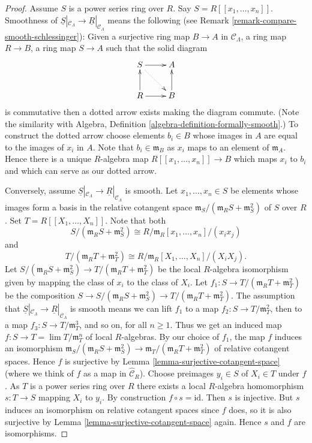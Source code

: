 \documentclass[10pt,a4paper]{amsart}
\theoremstyle{plain}
\theoremstyle{definition}
\theoremstyle{remark}
\numberwithin{equation}{subsection}
\def\lim{\mathop{\mathrm{lim}}\nolimits}
\begin{document}
\begin{proof}
Assume $S$ is a power series ring over $R$. Say $S = R[[x_1, \ldots, x_n]]$.
Smoothness of
$\underline{S}|_{\mathcal{C}_\Lambda} \to \underline{R}|_{\mathcal{C}_\Lambda}$
means the following (see Remark \ref{remark-compare-smooth-schlessinger}):
Given a surjective ring map $B \to A$ in
$\mathcal{C}_\Lambda$, a ring map $R \to B$, a ring map $S \to A$ such that
the solid diagram
$$
\xymatrix{
S \ar[r] \ar@{..>}[rd] & A \\
R \ar[u] \ar[r] & B \ar[u]
}
$$
is commutative then a dotted arrow exists making the diagram commute.
(Note the similarity with
Algebra, Definition \ref{algebra-definition-formally-smooth}.)
To construct the dotted arrow choose elements $b_i \in B$ whose images
in $A$ are equal to the images of $x_i$ in $A$. Note that
$b_i \in \mathfrak m_B$ as $x_i$ maps to an element of $\mathfrak m_A$.
Hence there is a unique $R$-algebra map $R[[x_1, \ldots, x_n]] \to B$
which maps $x_i$ to $b_i$ and which can serve as our dotted arrow.

\medskip\noindent
Conversely, assume
$\underline{S}|_{\mathcal{C}_\Lambda} \to \underline{R}|_{\mathcal{C}_\Lambda}$
is smooth. Let $x_1, \ldots, x_n \in S$ be elements whose images
form a basis in the relative cotangent space
$\mathfrak m_S/(\mathfrak m_R S + \mathfrak m_S^2)$ of $S$ over $R$.
Set $T = R[[X_1, \ldots, X_n]]$. Note that both
$$
S/(\mathfrak m_R S + \mathfrak m_S^2) \cong
R/\mathfrak m_R[x_1, \ldots, x_n]/(x_ix_j)
$$
and
$$
T/(\mathfrak m_R T + \mathfrak m_T^2) \cong
R/\mathfrak m_R[X_1, \ldots, X_n]/(X_iX_j).
$$
Let
$S/(\mathfrak m_R S + \mathfrak m_S^2) \to
T/(\mathfrak m_R T + \mathfrak m_T^2)$
be the local $R$-algebra isomorphism given by mapping
the class of $x_i$ to the class of $X_i$. Let
$f_1 : S \to T/(\mathfrak m_R T + \mathfrak m_T^2)$ be the
composition
$S \to S/(\mathfrak m_R S + \mathfrak m_S^2)
\to T/(\mathfrak m_R T + \mathfrak m_T^2)$.
The assumption that
$\underline{S}|_{\mathcal{C}_\Lambda} \to \underline{R}|_{\mathcal{C}_\Lambda}$
is smooth means we can lift $f_1$ to a map
$f_2 : S \to T/\mathfrak{m}_T^2$, then to a map
$f_3 : S \to T/\mathfrak{m}_T^3$, and so on, for all $n \geq 1$. Thus
we get an induced map $f : S \to T = \lim T/\mathfrak m_T^n$
of local $R$-algebras. By our choice of $f_1$, the map $f$ induces an
isomorphism
$\mathfrak m_S/(\mathfrak m_R S + \mathfrak m_S^2) \to
\mathfrak m_T/(\mathfrak m_R T + \mathfrak m_T^2)$
of relative cotangent spaces.
Hence $f$ is surjective by
Lemma \ref{lemma-surjective-cotangent-space}
(where we think of $f$ as a map in $\widehat{\mathcal{C}}_R$).
Choose preimages $y_i \in S$ of $X_i \in T$ under $f$. As $T$ is a
power series ring over $R$ there exists a local
$R$-algebra homomorphism $s : T \to S$ mapping $X_i$ to $y_i$.
By construction $f \circ s = \text{id}$. Then $s$ is injective.
But $s$ induces an isomorphism on relative cotangent spaces since
$f$ does, so it is also surjective by
Lemma \ref{lemma-surjective-cotangent-space}
again. Hence $s$ and $f$ are isomorphisms.
\end{proof}
\end{document}
